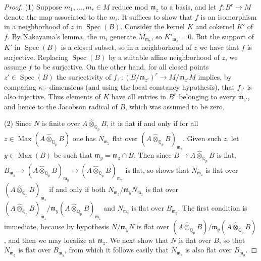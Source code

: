 \documentclass[12pt]{article}
\theoremstyle{definition}
\numberwithin{equation}{theorem}
\newcommand{\gothm}{\mathfrak{m}}
\newcommand{\QQ}{\mathbb{Q}}
\def\Qp{\QQ_p}
\DeclareMathOperator{\Max}{Max}
\DeclareMathOperator{\Spec}{Spec}
\begin{document}
\begin{proof}
(1) Suppose $m_1,\ldots,m_r \in M$ reduce mod $\gothm_z$ to a basis,
and let $f: B^r \to M$ denote the map associated to the $m_i$.  It
suffices to show that $f$ is an isomorphism in a neighborhood of $z$
in $\Spec(B)$.  Consider the kernel $K$ and cokernel $K'$ of $f$.  By
Nakayama's lemma, the $m_i$ generate $M_{\gothm_z}$, so $K'_{\gothm_z}
= 0$.  But the support of $K'$ in $\Spec(B)$ is a closed subset, so in
a neighborhood of $z$ we have that $f$ is surjective.  Replacing
$\Spec(B)$ by a suitable affine neighborhood of $z$, we assume $f$ to
be surjective.  On the other hand, for all closed points $z' \in
\Spec(B)$ the surjectivity of $f_{z'}: (B/\gothm_{z'})^r \to
M/\gothm_{z'}M$ implies, by comparing $\kappa_{z'}$-dimensions (and
using the local constancy hypothesis), that $f_{z'}$ is also
injective.  Thus elements of $K$ have all entries in $B^r$ belonging
to every $\gothm_{z'}$, and hence to the Jacobson radical of $B$,
which was assumed to be zero.

(2) Since $N$ is finite over $A \widehat\otimes_{\Qp} B$, it is flat
if and only if for all $z \in \Max(A \widehat\otimes_{\Qp} B)$ one has
$N_{\gothm_z}$ flat over $(A \widehat\otimes_{\Qp} B)_{\gothm_z}$.
Given such $z$, let $y \in \Max(B)$ be such that $\gothm_y = \gothm_z
\cap B$.  Then since $B \to A \widehat\otimes_{\Qp} B$ is flat,
$B_{\gothm_y} \to (A \widehat\otimes_{\Qp} B)_{\gothm_y} \to (A
\widehat\otimes_{\Qp} B)_{\gothm_z}$ is flat, so \cite[0.10.2.5]{ega3}
shows that $N_{\gothm_z}$ is flat over $(A \widehat\otimes_{\Qp}
B)_{\gothm_z}$ if and only if both $N_{\gothm_z}/\gothm_yN_{\gothm_z}$
is flat over $(A \widehat\otimes_{\Qp} B)_{\gothm_z}/\gothm_y(A
\widehat\otimes_{\Qp} B)_{\gothm_z}$ and $N_{\gothm_z}$ is flat over
$B_{\gothm_y}$.  The first condition is immediate, because by
hypothesis $N/\gothm_yN$ is flat over $(A \widehat\otimes_{\Qp}
B)/\gothm_y(A \widehat\otimes_{\Qp} B)$, and then we may localize at
$\gothm_z$.  We next show that $N$ is flat over $B$, so that
$N_{\gothm_y}$ is flat over $B_{\gothm_y}$, from which it follows
easily that $N_{\gothm_z}$ is also flat over $B_{\gothm_y}$.


\end{proof}
\end{document}
